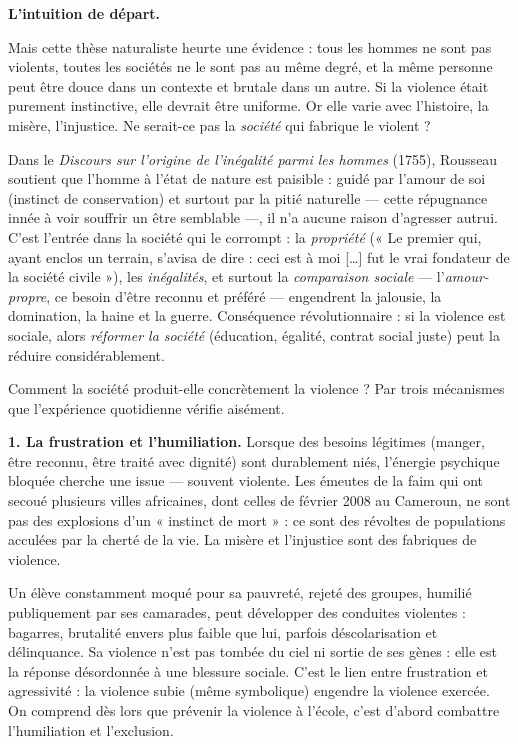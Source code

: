 \documentclass[11pt]{article}
\newcommand{\cle}[1]{{\popxbold\color{popdark}#1}}
\newcounter{popsec}
\newcounter{popsub}
\newcommand{\courssub}[1]{%
  \stepcounter{popsub}%
  \par\vspace{9pt}\noindent{\popxbold\fontsize{11.5}{13}\selectfont\color{popink}{\color{poporange}\thepopsec.\thepopsub}\hspace{6pt}#1}\par\nopagebreak\vspace{4pt}
}
\begin{document}
\courssub{La thèse adverse : la violence comme produit social}

\textbf{L'intuition de départ.}\par
Mais cette thèse naturaliste heurte une évidence : tous les hommes ne sont pas violents, toutes les sociétés ne le sont pas au même degré, et la même personne peut être douce dans un contexte et brutale dans un autre. Si la violence était purement instinctive, elle devrait être uniforme. Or elle varie avec l'histoire, la misère, l'injustice. Ne serait-ce pas la \emph{société} qui fabrique le violent ?

\begin{propriete}
Dans le \emph{Discours sur l'origine de l'inégalité parmi les hommes} (1755), Rousseau soutient que l'homme à l'état de nature est paisible : guidé par l'amour de soi (instinct de conservation) et surtout par la \cle{pitié naturelle} — cette répugnance innée à voir souffrir un être semblable —, il n'a aucune raison d'agresser autrui. C'est l'entrée dans la société qui le corrompt : la \emph{propriété} (« Le premier qui, ayant enclos un terrain, s'avisa de dire : ceci est à moi [\ldots] fut le vrai fondateur de la société civile »), les \emph{inégalités}, et surtout la \emph{comparaison sociale} — l'\emph{amour-propre}, ce besoin d'être reconnu et préféré — engendrent la jalousie, la domination, la haine et la guerre. Conséquence révolutionnaire : si la violence est sociale, alors \emph{réformer la société} (éducation, égalité, contrat social juste) peut la réduire considérablement.
\end{propriete}

Comment la société produit-elle concrètement la violence ? Par trois mécanismes que l'expérience quotidienne vérifie aisément.

\textbf{1. La frustration et l'humiliation.} Lorsque des besoins légitimes (manger, être reconnu, être traité avec dignité) sont durablement niés, l'énergie psychique bloquée cherche une issue — souvent violente. Les émeutes de la faim qui ont secoué plusieurs villes africaines, dont celles de février 2008 au Cameroun, ne sont pas des explosions d'un « instinct de mort » : ce sont des révoltes de populations acculées par la cherté de la vie. La misère et l'injustice sont des fabriques de violence.

\begin{exemplebox}
Un élève constamment moqué pour sa pauvreté, rejeté des groupes, humilié publiquement par ses camarades, peut développer des conduites violentes : bagarres, brutalité envers plus faible que lui, parfois déscolarisation et délinquance. Sa violence n'est pas tombée du ciel ni sortie de ses gènes : elle est la réponse désordonnée à une blessure sociale. C'est le lien entre \cle{frustration} et \cle{agressivité} : la violence subie (même symbolique) engendre la violence exercée. On comprend dès lors que prévenir la violence à l'école, c'est d'abord combattre l'humiliation et l'exclusion.
\end{exemplebox}
\end{document}
